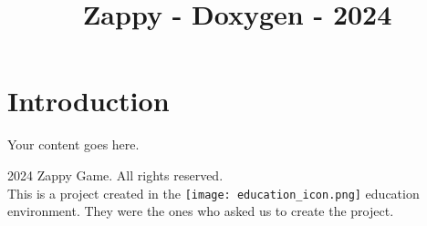 \documentclass{article}
\begin{document}
\title{Zappy - Doxygen - 2024}
\author{}
\date{}
\maketitle

\section{Introduction}
Your content goes here.

\lipsum[1-10]

\clearpage
\thispagestyle{empty} %
\begin{center}
    \small \textcopyright{} 2024 Zappy Game. All rights reserved. \\
    \small This is a project created in the \texttt{[image: education\_icon.png]} education environment. They were the ones who asked us to create the project.
\end{center}
\end{document}
